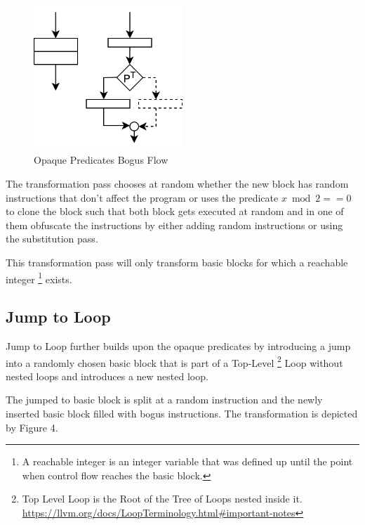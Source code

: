 \begin{figure}[b]
  \includegraphics[width=0.5\textwidth]{./images/op.png}
  \caption{Opaque Predicates Bogus Flow}
\end{figure}

The transformation pass chooses at random whether the new block has random instructions that don't affect the program
or uses the predicate \textbf{$x \bmod 2 == 0$} to clone the block such that both block gets executed at random and in one of them
obfuscate the instructions by either adding random instructions or using the substitution pass.

This transformation pass will only transform basic blocks for which a reachable integer \footnote{A reachable integer is an integer variable that was defined up until the point when control flow reaches the basic block.} exists.

\subsection{Jump to Loop}
Jump to Loop further builds upon the opaque predicates by introducing a jump into a randomly chosen basic block
that is part of a Top-Level \footnote{Top Level Loop is the Root of the Tree of Loops nested inside it. \url{https://llvm.org/docs/LoopTerminology.html#important-notes}} Loop without
nested loops and introduces a new nested loop.

The jumped to basic block is split at a random instruction and the newly inserted
basic block filled with bogus instructions. The transformation is depicted by Figure 4.

